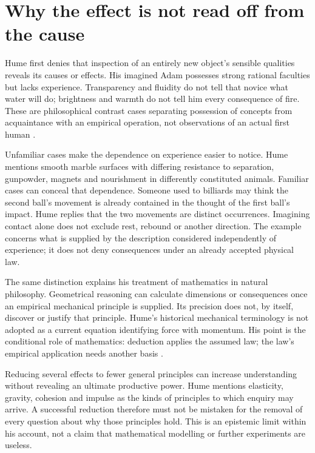 \section{Why the effect is not read off from the cause}
\label{sec:p15-hume-experience}

Hume first denies that inspection of an entirely new object's sensible
qualities reveals its causes or effects. His imagined Adam possesses
strong rational faculties but lacks experience. Transparency and fluidity
do not tell that novice what water will do; brightness and warmth do not
tell him every consequence of fire. These are philosophical contrast
cases separating possession of concepts from acquaintance with an
empirical operation, not observations of an actual first human
\parencite[E~4.6--4.8]{Hume1777EnquiryHTO}.

Unfamiliar cases make the dependence on experience easier to notice.
Hume mentions smooth marble surfaces with differing resistance to
separation, gunpowder, magnets and nourishment in differently constituted
animals. Familiar cases can conceal that dependence. Someone used to
billiards may think the second ball's movement is already contained in
the thought of the first ball's impact. Hume replies that the two
movements are distinct occurrences. Imagining contact alone does not
exclude rest, rebound or another direction. The example concerns what
is supplied by the description considered independently of experience;
it does not deny consequences under an already accepted physical law.

The same distinction explains his treatment of mathematics in natural
philosophy. Geometrical reasoning can calculate dimensions or consequences
once an empirical mechanical principle is supplied. Its precision does
not, by itself, discover or justify that principle. Hume's historical
mechanical terminology is not adopted as a current equation identifying
force with momentum. His point is the conditional role of mathematics:
deduction applies the assumed law; the law's empirical application needs
another basis \parencite[E~4.9--4.13]{Hume1777EnquiryHTO}.

Reducing several effects to fewer general principles can increase
understanding without revealing an ultimate productive power. Hume
mentions elasticity, gravity, cohesion and impulse as the kinds of
principles to which enquiry may arrive. A successful reduction therefore
must not be mistaken for the removal of every question about why those
principles hold. This is an epistemic limit within his account, not a
claim that mathematical modelling or further experiments are useless.

